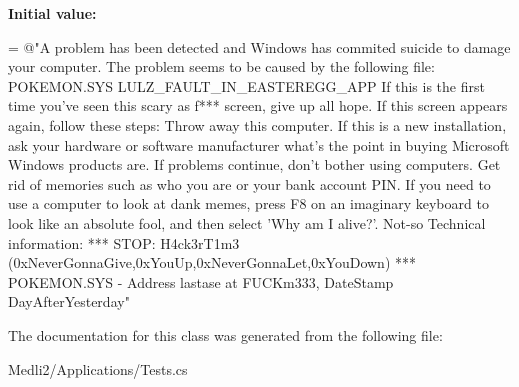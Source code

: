 {\bfseries Initial value\+:}
\begin{DoxyCode}
= \textcolor{stringliteral}{@"A problem has been detected and Windows has commited suicide to damage your computer.}
\textcolor{stringliteral}{The problem seems to be caused by the following file: POKEMON.SYS}
\textcolor{stringliteral}{}
\textcolor{stringliteral}{LULZ\_FAULT\_IN\_EASTEREGG\_APP}
\textcolor{stringliteral}{}
\textcolor{stringliteral}{If this is the first time you've seen this scary as f*** screen,}
\textcolor{stringliteral}{give up all hope. If this screen appears again, follow these steps:}
\textcolor{stringliteral}{Throw away this computer.}
\textcolor{stringliteral}{If this is a new installation, ask your hardware or software manufacturer}
\textcolor{stringliteral}{what's the point in buying Microsoft Windows products are.}
\textcolor{stringliteral}{If problems continue, don't bother using computers. }
\textcolor{stringliteral}{Get rid of memories such as who you are or your bank account PIN.}
\textcolor{stringliteral}{If you need to use a computer to look at dank memes,}
\textcolor{stringliteral}{press F8 on an imaginary keyboard to look like an absolute fool, and then select 'Why am I alive?'.}
\textcolor{stringliteral}{Not-so Technical information:}
\textcolor{stringliteral}{*** STOP: H4ck3rT1m3 (0xNeverGonnaGive,0xYouUp,0xNeverGonnaLet,0xYouDown)}
\textcolor{stringliteral}{***  POKEMON.SYS - Address lastase at FUCKm333, DateStamp DayAfterYesterday"}
\end{DoxyCode}


The documentation for this class was generated from the following file\+:\begin{DoxyCompactItemize}
\item 
Medli2/\+Applications/Tests.\+cs\end{DoxyCompactItemize}
